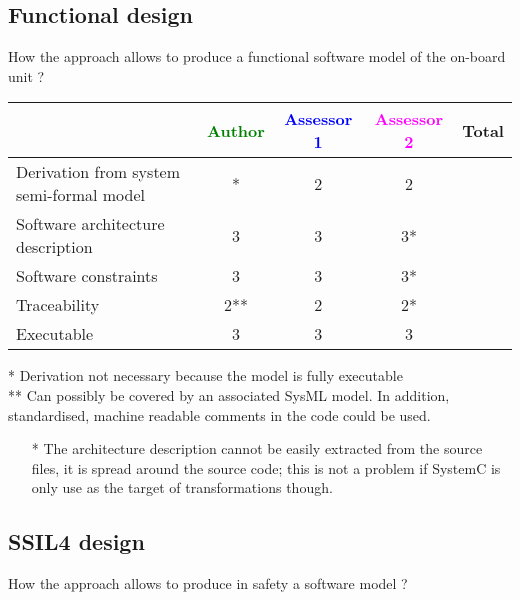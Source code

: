 \subsection{Functional design}

How the approach allows to produce a functional software model of the on-board unit ?

\begin{tabular}{|l | c | c | c | c|}
\hline
& \textcolor{green}{Author} & \textcolor{blue}{Assessor 1} & \textcolor{magenta}{Assessor 2} & Total \\
\hline
Derivation from system semi-formal model &* &2 &2 & \\
\hline
Software architecture description &3 &3 &3* & \\
\hline
Software constraints &3 &3 &3* & \\
\hline
Traceability &2** &2 &2* & \\
\hline
Executable &3 &3 &3 & \\
\hline
\end{tabular}

\begin{author_comment}
* Derivation not necessary because the model is fully executable\\
** Can possibly be covered by an associated SysML model. In addition, standardised, machine readable comments in the code could be used.\\
\end{author_comment}

\begin{assessor2}
  \begin{itemize}
  \item[*] The architecture description cannot be easily extracted
    from the source files, it is spread around the source code; this
    is not a problem if SystemC is only use as the target of
    transformations though.
  \end{itemize}  
\end{assessor2}


\subsection{SSIL4 design}

How the approach allows to produce in safety a software model ?

